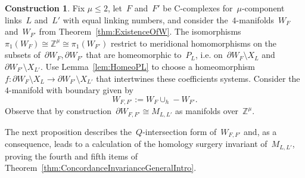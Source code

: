 \documentclass[10.9pt,a4paper]{amsart}
\theoremstyle{definition}
\newtheorem{construction}[theorem]{Construction}
\theoremstyle{remark}
\newcommand{\Z}{\mathbb{Z}}
\begin{document}
\begin{construction}
\label{cons:WFF}
Fix $\mu \leq 2$, let~$F$ and~$F'$ be C-complexes for~$\mu$-component links~$L$ and~$L'$ with equal linking numbers,   and consider the~$4$-manifolds~$W_F$ and~$W_{F'}$ from Theorem~\ref{thm:ExistenceOfW}.
The isomorphisms~$\pi_1(W_F) \cong \Z^\mu \cong \pi_1(W_{F'})$ restrict to meridional homomorphisms on the subsets of~$\partial W_F,\partial W_{F'}$ that are homeomorphic to~$P_L$, i.e. on~$\partial W_F \setminus X_L$ and~$\partial W_{F'} \setminus X_{L'}$.
Use Lemma~\ref{lem:HomeoPL} to choose a homeomorphism~$f \colon \partial W_F \setminus X_L \to \partial W_{F'} \setminus X_{L'}$ that intertwines these coefficients systems.
Consider the~$4$-manifold with boundary given by
$$W_{F,F'}:=W_F \cup_h -W_{F'}.$$
Observe that by construction~$\partial W_{F,F'} \cong M_{L,L'}$ as manifolds over~$\Z^\mu$.
\end{construction}

The next proposition describes the~$Q$-intersection form of~$W_{F,F'}$ and, as a consequence,  leads to a calculation of the homology surgery invariant of~$M_{L,L'}$,  proving the fourth and fifth items of Theorem~\ref{thm:ConcordanceInvarianceGeneralIntro}.
\end{document}
